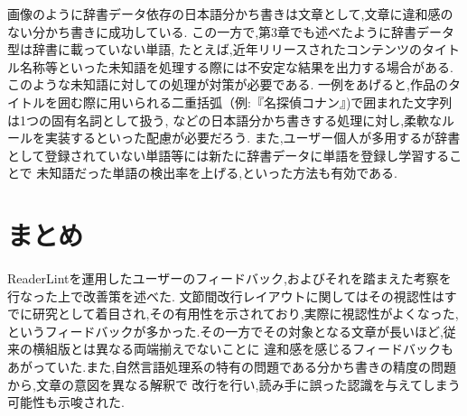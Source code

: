 
画像のように辞書データ依存の日本語分かち書きは文章として,文章に違和感のない分かち書きに成功している.
この一方で,第3章でも述べたように辞書データ型は辞書に載っていない単語,
たとえば,近年リリースされたコンテンツのタイトル名称等といった未知語を処理する際には不安定な結果を出力する場合がある.
このような未知語に対しての処理が対策が必要である.
一例をあげると,作品のタイトルを囲む際に用いられる二重括弧（例:『名探偵コナン』)で囲まれた文字列は1つの固有名詞として扱う,
などの日本語分かち書きする処理に対し,柔軟なルールを実装するといった配慮が必要だろう.
また,ユーザー個人が多用するが辞書として登録されていない単語等には新たに辞書データに単語を登録し学習することで
未知語だった単語の検出率を上げる,といった方法も有効である.

\section{まとめ}
ReaderLintを運用したユーザーのフィードバック,およびそれを踏まえた考察を行なった上で改善策を述べた.
文節間改行レイアウトに関してはその視認性はすでに研究として着目され,その有用性を示されており,実際に視認性がよくなった,
というフィードバックが多かった.その一方でその対象となる文章が長いほど,従来の横組版とは異なる両端揃えでないことに
違和感を感じるフィードバックもあがっていた.また,自然言語処理系の特有の問題である分かち書きの精度の問題から,文章の意図を異なる解釈で
改行を行い,読み手に誤った認識を与えてしまう可能性も示唆された.